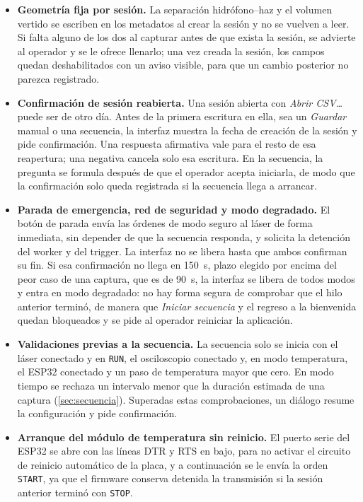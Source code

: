 \begin{itemize}
  \item \textbf{Geometría fija por sesión.} La separación
    hidrófono--haz y el volumen vertido se escriben en los metadatos
    al crear la sesión y no se vuelven a leer. Si falta alguno de los
    dos al capturar antes de que exista la sesión, se advierte al
    operador y se le ofrece llenarlo; una vez creada la sesión, los
    campos quedan deshabilitados con un aviso visible, para que un
    cambio posterior no parezca registrado.

  \item \textbf{Confirmación de sesión reabierta.} Una sesión abierta
    con \textit{Abrir CSV\ldots} puede ser de otro día. Antes de la
    primera escritura en ella, sea un \textit{Guardar} manual o una
    secuencia, la interfaz muestra la fecha de creación de la sesión y
    pide confirmación. Una respuesta afirmativa vale para el resto de
    esa reapertura; una negativa cancela solo esa escritura. En la
    secuencia, la pregunta se formula después de que el operador
    acepta iniciarla, de modo que la confirmación solo queda registrada
    si la secuencia llega a arrancar.

  \item \textbf{Parada de emergencia, red de seguridad y modo
    degradado.} El botón de parada envía las órdenes de modo seguro al
    láser de forma inmediata, sin depender de que la secuencia
    responda, y solicita la detención del worker y del trigger. La
    interfaz no se libera hasta que ambos confirman su fin. Si esa
    confirmación no llega en \SI{150}{\second}, plazo elegido por
    encima del peor caso de una captura, que es de \SI{90}{\second},
    la interfaz se libera de todos modos y entra en modo degradado: no
    hay forma segura de comprobar que el hilo anterior terminó, de
    manera que \textit{Iniciar secuencia} y el regreso a la bienvenida
    quedan bloqueados y se pide al operador reiniciar la aplicación.

  \item \textbf{Validaciones previas a la secuencia.} La secuencia solo
    se inicia con el láser conectado y en \texttt{RUN}, el osciloscopio
    conectado y, en modo temperatura, el ESP32 conectado y un paso de
    temperatura mayor que cero. En modo tiempo se rechaza un intervalo
    menor que la duración estimada de una captura
    (\cref{sec:secuencia}). Superadas estas comprobaciones, un diálogo
    resume la configuración y pide confirmación.

  \item \textbf{Arranque del módulo de temperatura sin reinicio.} El
    puerto serie del ESP32 se abre con las líneas DTR y RTS en bajo,
    para no activar el circuito de reinicio automático de la placa, y
    a continuación se le envía la orden \texttt{START}, ya que el
    firmware conserva detenida la transmisión si la sesión anterior
    terminó con \texttt{STOP}.


\end{itemize}
